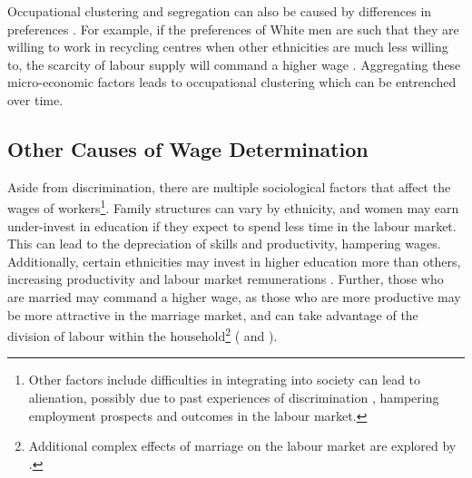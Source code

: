 \documentclass[class=article, crop=false]{standalone}
\begin{document}
Occupational clustering and segregation can also be caused by differences in preferences \citep{Thaler}. For example, if the preferences of White men are such that they are willing to work in recycling centres when other ethnicities are much less willing to, the scarcity of labour supply will command a higher wage \citep{Altonji}. Aggregating these micro-economic factors leads to occupational clustering which can be entrenched over time.


\subsection{Other Causes of Wage Determination}
\label{sec:other_causes_of_discrimination}
Aside from discrimination, there are multiple sociological factors that affect the wages of workers\footnote{Other factors include difficulties in integrating into society can lead to alienation, possibly due to past experiences of discrimination \citep{Berthoud}, hampering employment prospects and outcomes in the labour market.}. Family structures can vary by ethnicity, and women may earn under-invest in education if they expect to spend less time in the labour market. This can lead to the depreciation of skills and productivity, hampering wages. Additionally, certain ethnicities may invest in higher education more than others, increasing productivity and labour market remunerations \citep{Becker}. Further, those who are married may command a higher wage, as those who are more productive may be more attractive in the marriage market, and can take advantage of the division of labour within the household\footnote{Additional complex effects of marriage on the labour market are explored by \citep{Ahituv}.} (\citet{Nakosteen} and \citet{Bardasi}).
\end{document}
